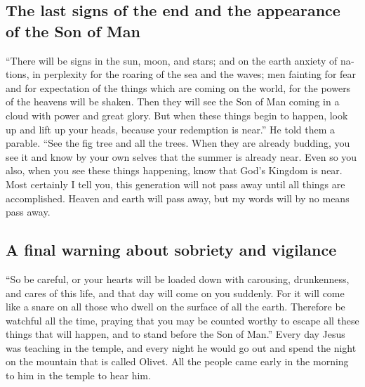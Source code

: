 \begin{paracol}{2}
\begin{otherlanguage}{english}
\begin{otherlanguage}{english}
\hypertarget{the-last-signs-of-the-end-and-the-appearance-of-the-son-of-man}{%
\subsection{The last signs of the end and the appearance of the Son of
Man}\label{the-last-signs-of-the-end-and-the-appearance-of-the-son-of-man}}

 ``There will be signs in the sun, moon, and stars; and
on the earth anxiety of nations, in perplexity for the roaring of the
sea and the waves;  men fainting for fear and for
expectation of the things which are coming on the world, for the powers
of the heavens will be shaken.  Then they will see the
Son of Man coming in a cloud with power and great glory. 
But when these things begin to happen, look up and lift up your heads,
because your redemption is near.''  He told them a
parable. ``See the fig tree and all the trees.  When they
are already budding, you see it and know by your own selves that the
summer is already near.  Even so you also, when you see
these things happening, know that God's Kingdom is near. 
Most certainly I tell you, this generation will not pass away until all
things are accomplished.  Heaven and earth will pass
away, but my words will by no means pass away.

\hypertarget{a-final-warning-about-sobriety-and-vigilance}{%
\subsection{A final warning about sobriety and
vigilance}\label{a-final-warning-about-sobriety-and-vigilance}}

 ``So be careful, or your hearts will be loaded down with
carousing, drunkenness, and cares of this life, and that day will come
on you suddenly.  For it will come like a snare on all
those who dwell on the surface of all the earth. 
Therefore be watchful all the time, praying that you may be counted
worthy to escape all these things that will happen, and to stand before
the Son of Man.''  Every day Jesus was teaching in the
temple, and every night he would go out and spend the night on the
mountain that is called Olivet.  All the people came
early in the morning to him in the temple to hear him.

\end{otherlanguage}


\end{otherlanguage}
\end{paracol}

